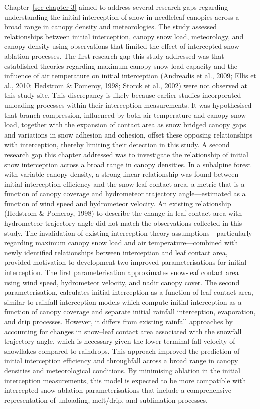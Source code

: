 \documentclass[
  letterpaper,
]{tex/uofsthesis-cs}
\begin{document}
Chapter~\ref{sec-chapter-3} aimed to address several research gaps
regarding understanding the initial interception of snow in needleleaf
canopies across a broad range in canopy density and meteorologies. The
study assessed relationships between initial interception, canopy snow
load, meteorology, and canopy density using observations that limited
the effect of intercepted snow ablation processes. The first research
gap this study addressed was that established theories regarding maximum
canopy snow load capacity and the influence of air temperature on
initial interception (Andreadis et al., 2009; Ellis et al., 2010;
Hedstrom \& Pomeroy, 1998; Storck et al., 2002) were not observed at
this study site. This discrepancy is likely because earlier studies
incorporated unloading processes within their interception measurements.
It was hypothesised that branch compression, influenced by both air
temperature and canopy snow load, together with the expansion of contact
area as snow bridged canopy gaps and variations in snow adhesion and
cohesion, offset these opposing relationships with interception, thereby
limiting their detection in this study. A second research gap this
chapter addressed was to investigate the relationship of initial snow
interception across a broad range in canopy densities. In a subalpine
forest with variable canopy density, a strong linear relationship was
found between initial interception efficiency and the snow-leaf contact
area, a metric that is a function of canopy coverage and hydrometeor
trajectory angle---estimated as a function of wind speed and hydrometeor
velocity. An existing relationship (Hedstrom \& Pomeroy, 1998) to
describe the change in leaf contact area with hydrometeor trajectory
angle did not match the observations collected in this study. The
invalidation of existing interception theory assumptions---particularly
regarding maximum canopy snow load and air temperature---combined with
newly identified relationships between interception and leaf contact
area, provided motivation to development two improved parameterisations
for initial interception. The first parameterisation approximates
snow-leaf contact area using wind speed, hydrometeor velocity, and nadir
canopy cover. The second parameterisation, calculates initial
interception as a function of leaf contact area, similar to rainfall
interception models which compute initial interception as a function of
canopy coverage and separate initial rainfall interception, evaporation,
and drip processes. However, it differs from existing rainfall
approaches by accounting for changes in snow--leaf contact area
associated with the snowfall trajectory angle, which is necessary given
the lower terminal fall velocity of snowflakes compared to raindrops.
This approach improved the prediction of initial interception efficiency
and throughfall across a broad range in canopy densities and
meteorological conditions. By minimising ablation in the initial
interception measurements, this model is expected to be more compatible
with intercepted snow ablation parameterisations that include a
comprehensive representation of unloading, melt/drip, and sublimation
processes.
\end{document}
